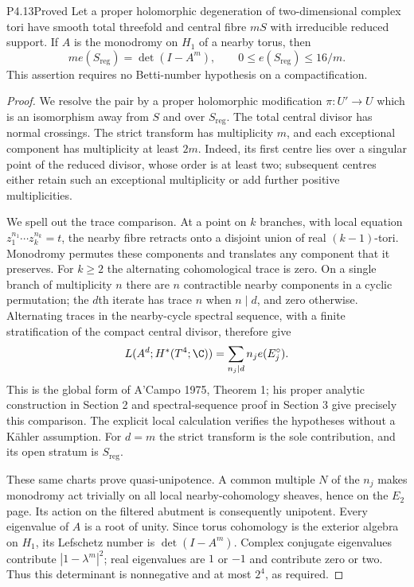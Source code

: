 \begin{statement}{P4.13}{Proved}
Let a proper holomorphic degeneration of two-dimensional complex
tori have smooth total threefold and central fibre $mS$ with
irreducible reduced support. If $A$ is the monodromy on $H_1$ of
a nearby torus, then
\[
 m e(S_{\mathrm{reg}})=\det(I-A^m),\qquad
 0\le e(S_{\mathrm{reg}})\le16/m.
\]
This assertion requires no Betti-number hypothesis on a compactification.
\end{statement}
\begin{proof}
We resolve the pair by a proper holomorphic modification
$\pi:U'\to U$ which is an isomorphism away from $S$ and over
$S_{\mathrm{reg}}$. The total central divisor has normal crossings.
The strict transform has multiplicity $m$, and each exceptional
component has multiplicity at least $2m$. Indeed, its first centre
lies over a singular point of the reduced divisor, whose order is
at least two; subsequent centres either retain such an exceptional
multiplicity or add further positive multiplicities.

We spell out the trace comparison. At a point on $k$ branches,
with local equation $z_1^{n_1}\cdots z_k^{n_k}=t$, the nearby
fibre retracts onto a disjoint union of real $(k-1)$-tori.
Monodromy permutes these components and translates any component
that it preserves. For $k\ge2$ the alternating cohomological
trace is zero. On a single branch of multiplicity $n$ there are
$n$ contractible nearby components in a cyclic permutation;
the $d$th iterate has trace $n$ when $n\mid d$, and zero otherwise.
Alternating traces in the nearby-cycle spectral sequence, with a
finite stratification of the compact central divisor, therefore give
\[
 L(A^d;H^*(T^4;\C))=\sum_{n_j\mid d}n_j e(E_j^\circ).
\]
This is the global form of A'Campo 1975, Theorem 1; his proper
analytic construction in Section 2 and spectral-sequence proof in
Section 3 give precisely this comparison. The explicit local
calculation verifies the hypotheses without a Kähler assumption.
For $d=m$ the strict transform is the sole contribution, and its
open stratum is $S_{\mathrm{reg}}$.

These same charts prove quasi-unipotence. A common multiple $N$
of the $n_j$ makes monodromy act trivially on all local
nearby-cohomology sheaves, hence on the $E_2$ page. Its action
on the filtered abutment is consequently unipotent. Every
eigenvalue of $A$ is a root of unity. Since torus cohomology is
the exterior algebra on $H_1$, its Lefschetz number is
$\det(I-A^m)$. Complex conjugate eigenvalues contribute
$|1-\lambda^m|^2$; real eigenvalues are $1$ or $-1$ and
contribute zero or two. Thus this determinant is nonnegative
and at most $2^4$, as required.
\end{proof}

